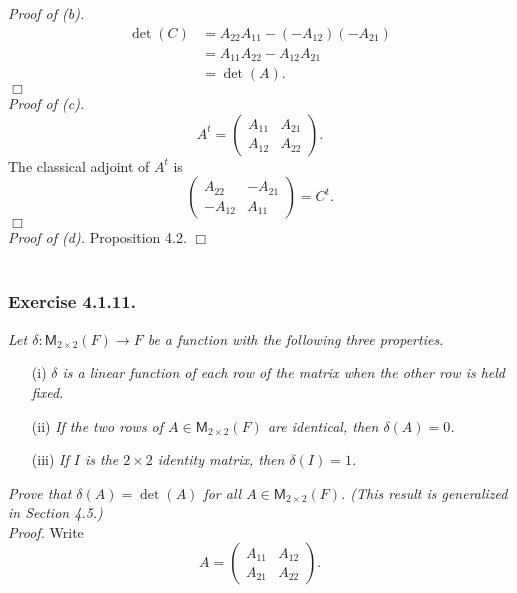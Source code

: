 \documentclass{article}
\begin{document}
\emph{Proof of (b).}
\begin{align*}
\det(C)
&= A_{22}A_{11} - (-A_{12})(-A_{21}) \\
&= A_{11}A_{22} - A_{12}A_{21} \\
&= \det(A).
\end{align*}
$\Box$ \\

\emph{Proof of (c).}
$$A^t =
\begin{pmatrix}
A_{11} & A_{21} \\
A_{12} & A_{22}
\end{pmatrix}.$$
The classical adjoint of $A^t$ is
$$
\begin{pmatrix}
A_{22} & -A_{21} \\
-A_{12} & A_{11}
\end{pmatrix} = C^t.$$
$\Box$ \\

\emph{Proof of (d).}
Proposition 4.2.
$\Box$ \\\\






\subsubsection*{Exercise 4.1.11.}
\emph{Let $\delta: \mathsf{M}_{2 \times 2}(F) \to F$
be a function with the following three properties.}
\begin{enumerate}
\item[(i)]
\emph{$\delta$ is a linear function of each row of the matrix when the other row
is held fixed.}
\item[(ii)]
\emph{If the two rows of $A \in \mathsf{M}_{2 \times 2}(F)$ are identical,
then $\delta(A) = 0$.}
\item[(iii)]
\emph{If $I$ is the $2 \times 2$ identity matrix, then $\delta(I) = 1$.}
\end{enumerate}
\emph{Prove that $\delta(A) = \det(A)$ for all $A \in \mathsf{M}_{2 \times 2}(F)$.
(This result is generalized in Section 4.5.)} \\

\emph{Proof.}
Write
$$A =
\begin{pmatrix}
A_{11} & A_{12} \\
A_{21} & A_{22}
\end{pmatrix}.$$
\end{document}
